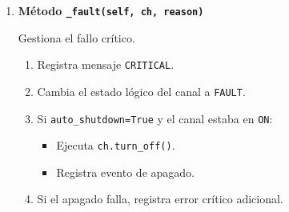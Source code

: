 \documentclass{article}
\begin{document}
\begin{enumerate}
\begin{enumerate}
\begin{enumerate}
Se considera inconsistencia grave y se dispara \texttt{FAULT}.

\item \textbf{Sobrecorriente software}

Si:

\begin{lstlisting}
i > ch.iset * HVLimits.I_TRIP_FACTOR
\end{lstlisting}

Se dispara \texttt{FAULT}.  
Esto implementa redundancia respecto al hardware.

\item \textbf{Flags hardware críticos}

Si el backend reporta:

\begin{itemize}
    \item \texttt{kill}
    \item \texttt{interlock}
    \item \texttt{ovc}
\end{itemize}

Se dispara \texttt{FAULT} inmediatamente.

\end{enumerate}

\item \textbf{Evaluación de alarmas externas}

Si existe \texttt{monitor}, se toman las últimas muestras y se evalúan alarmas.

Solo si una alarma devuelve \texttt{CRITICAL} se llama a \texttt{\_fault}.  
Los \texttt{WARNING} no generan apagado.

\end{enumerate}

\vspace{0.3cm}

\item \textbf{Método \texttt{\_fault(self, ch, reason)}}

Gestiona el fallo crítico.

\begin{enumerate}

\item Registra mensaje \texttt{CRITICAL}.
\item Cambia el estado lógico del canal a \texttt{FAULT}.
\item Si \texttt{auto\_shutdown=True} y el canal estaba en \texttt{ON}:
    \begin{itemize}
        \item Ejecuta \texttt{ch.turn\_off()}.
        \item Registra evento de apagado.
    \end{itemize}
\item Si el apagado falla, registra error crítico adicional.
\end{enumerate}


\end{enumerate}
\end{document}
